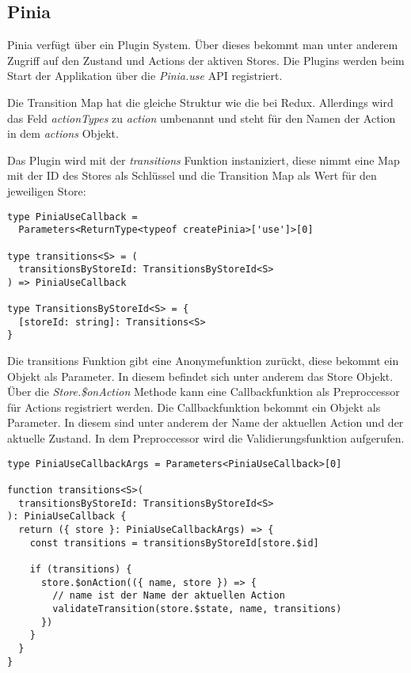 \subsection{Pinia}

Pinia verfügt über ein Plugin System. Über dieses bekommt man unter anderem Zugriff auf den Zustand und Actions der aktiven Stores. Die Plugins werden beim Start der Applikation über die \textit{Pinia.use} API registriert.

Die Transition Map hat die gleiche Struktur wie die bei Redux. Allerdings wird das Feld \textit{actionTypes} zu \textit{action} umbenannt und steht für den Namen der Action in dem \textit{actions} Objekt. 

Das Plugin wird mit der \textit{transitions} Funktion instaniziert, diese nimmt eine Map mit der ID des Stores als Schlüssel und die Transition Map als Wert für den jeweiligen Store:

\begin{lstlisting}
type PiniaUseCallback =
  Parameters<ReturnType<typeof createPinia>['use']>[0]

type transitions<S> = (
  transitionsByStoreId: TransitionsByStoreId<S>
) => PiniaUseCallback

type TransitionsByStoreId<S> = {
  [storeId: string]: Transitions<S>
}
\end{lstlisting}

Die transitions Funktion gibt eine Anonymefunktion zurückt, diese bekommt ein Objekt als Parameter. In diesem befindet sich unter anderem das Store Objekt. Über die \textit{Store.\$onAction} Methode kann eine Callbackfunktion als Preproccessor für Actions registriert werden. Die Callbackfunktion bekommt ein Objekt als Parameter. In diesem sind unter anderem der Name der aktuellen Action und der aktuelle Zustand. In dem Preproccessor wird die Validierungsfunktion aufgerufen.

\begin{lstlisting}  
type PiniaUseCallbackArgs = Parameters<PiniaUseCallback>[0]

function transitions<S>(
  transitionsByStoreId: TransitionsByStoreId<S>
): PiniaUseCallback {
  return ({ store }: PiniaUseCallbackArgs) => {
    const transitions = transitionsByStoreId[store.$id]
  
    if (transitions) {
      store.$onAction(({ name, store }) => {
        // name ist der Name der aktuellen Action
        validateTransition(store.$state, name, transitions)
      })
    }
  }
}  
\end{lstlisting}


